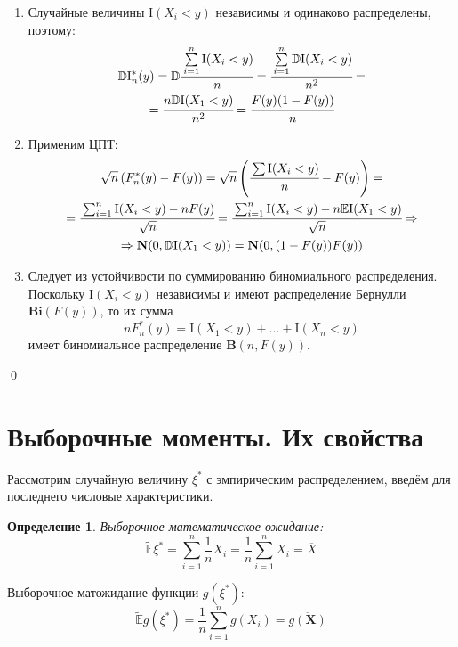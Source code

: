 \documentclass[oneside,final,14pt]{extreport}
\renewenvironment{proof}{{\bfseries Доказательство.}}{\qed}
\theoremstyle{plain}
\theoremstyle{definition}
\newtheorem*{defn}{Определение}
\theoremstyle{named}
\begin{document}
\begin{proof}
\begin{enumerate}
\begin{enumerate}[label={\arabic*)}]
        \item Случайные величины $\mathrm{I}(X_{i}<y)$ независимы и одинаково распределены, поэтому:
        \begin{multline*}
            \mathbb{D}\mathrm{I}_{n}^{*}(y)
            = \mathbb{D} \cfrac{\sum\limits_{i=1}^{n} \mathrm{I}(X_{i}<y)}{n}
            = \cfrac{\sum\limits_{i=1}^{n} \mathbb{D}\mathrm{I}(X_{i}<y)}{n^{2}}
            = \\
            = \cfrac{n\mathbb{D}\mathrm{I}(X_{1}<y)}{n^{2}}
            = \cfrac{F(y)(1-F(y))}{n}
        \end{multline*}
        \item Применим ЦПТ:
        \begin{multline*}
            \sqrt{n}\left(F_{n}^{*}(y)-F(y)\right)
            = \sqrt{n}\left(\cfrac{\sum \mathrm{I}(X_{i}<y)}{n}-F(y)\right) 
            = \\
            = \cfrac{\sum_{i=1}^{n} \mathrm{I}(X_{i}<y)-n F(y)}{\sqrt{n}} 
            = \cfrac{\sum_{i=1}^{n} \mathrm{I}(X_{i}<y)-n \mathbb{E}\mathrm{I}(X_{1}<y)}{\sqrt{n}} 
            \Rightarrow \\
            \Rightarrow \mathbf{N}(0, \mathbb{D}\mathrm{I}(X_{1}<y))
            = \mathbf{N}(0, (1-F(y))F(y))
        \end{multline*}
        \item Следует из устойчивости по суммированию биномиального распределения. Поскольку $\mathrm{I}\left(X_{i}<y\right)$ независимы и имеют распределение Бернулли $\mathbf{Bi}(F(y))$, то их сумма
        \begin{equation*}
            n F_{n}^{*}(y)=\mathrm{I}\left(X_{1}<y\right)+\ldots+\mathrm{I}\left(X_{n}<y\right)
        \end{equation*}
        имеет биномиальное распределение $\mathbf{B}(n, F(y))$.
    \end{enumerate}
\end{enumerate}  
\end{proof}

\section{Выборочные моменты. Их свойства}

Рассмотрим случайную величину $\xi^{*}$ с эмпирическим распределением, введём для последнего числовые характеристики.

\begin{defn}
{\it Выборочное математическое ожидание:} 
\begin{equation*}
    \tilde{\mathbb{E}} \xi^{*}=\sum\limits_{i=1}^{n} \frac{1}{n} X_{i}=\frac{1}{n} \sum\limits_{i=1}^{n} X_{i}=\overline{X}
\end{equation*}

Выборочное матожидание функции $g(\xi^{*})$:
\begin{equation*}
    \tilde{\mathbb{E}} g\left(\xi^{*}\right)=\frac{1}{n} \sum\limits_{i=1}^{n} g\left(X_{i}\right)=\overline{g(\mathbf{X})}
\end{equation*}
\end{defn}
\end{document}

